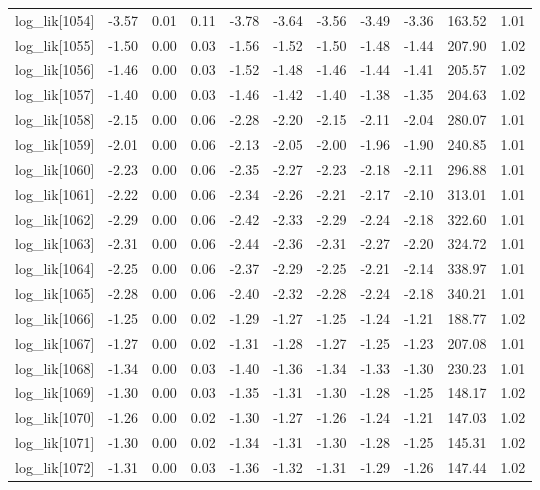 \begin{table}[ht]
\begin{tabular}{rrrrrrrrrrr}
  log\_lik[1054] & -3.57 & 0.01 & 0.11 & -3.78 & -3.64 & -3.56 & -3.49 & -3.36 & 163.52 & 1.01 \\ 
  log\_lik[1055] & -1.50 & 0.00 & 0.03 & -1.56 & -1.52 & -1.50 & -1.48 & -1.44 & 207.90 & 1.02 \\ 
  log\_lik[1056] & -1.46 & 0.00 & 0.03 & -1.52 & -1.48 & -1.46 & -1.44 & -1.41 & 205.57 & 1.02 \\ 
  log\_lik[1057] & -1.40 & 0.00 & 0.03 & -1.46 & -1.42 & -1.40 & -1.38 & -1.35 & 204.63 & 1.02 \\ 
  log\_lik[1058] & -2.15 & 0.00 & 0.06 & -2.28 & -2.20 & -2.15 & -2.11 & -2.04 & 280.07 & 1.01 \\ 
  log\_lik[1059] & -2.01 & 0.00 & 0.06 & -2.13 & -2.05 & -2.00 & -1.96 & -1.90 & 240.85 & 1.01 \\ 
  log\_lik[1060] & -2.23 & 0.00 & 0.06 & -2.35 & -2.27 & -2.23 & -2.18 & -2.11 & 296.88 & 1.01 \\ 
  log\_lik[1061] & -2.22 & 0.00 & 0.06 & -2.34 & -2.26 & -2.21 & -2.17 & -2.10 & 313.01 & 1.01 \\ 
  log\_lik[1062] & -2.29 & 0.00 & 0.06 & -2.42 & -2.33 & -2.29 & -2.24 & -2.18 & 322.60 & 1.01 \\ 
  log\_lik[1063] & -2.31 & 0.00 & 0.06 & -2.44 & -2.36 & -2.31 & -2.27 & -2.20 & 324.72 & 1.01 \\ 
  log\_lik[1064] & -2.25 & 0.00 & 0.06 & -2.37 & -2.29 & -2.25 & -2.21 & -2.14 & 338.97 & 1.01 \\ 
  log\_lik[1065] & -2.28 & 0.00 & 0.06 & -2.40 & -2.32 & -2.28 & -2.24 & -2.18 & 340.21 & 1.01 \\ 
  log\_lik[1066] & -1.25 & 0.00 & 0.02 & -1.29 & -1.27 & -1.25 & -1.24 & -1.21 & 188.77 & 1.02 \\ 
  log\_lik[1067] & -1.27 & 0.00 & 0.02 & -1.31 & -1.28 & -1.27 & -1.25 & -1.23 & 207.08 & 1.01 \\ 
  log\_lik[1068] & -1.34 & 0.00 & 0.03 & -1.40 & -1.36 & -1.34 & -1.33 & -1.30 & 230.23 & 1.01 \\ 
  log\_lik[1069] & -1.30 & 0.00 & 0.03 & -1.35 & -1.31 & -1.30 & -1.28 & -1.25 & 148.17 & 1.02 \\ 
  log\_lik[1070] & -1.26 & 0.00 & 0.02 & -1.30 & -1.27 & -1.26 & -1.24 & -1.21 & 147.03 & 1.02 \\ 
  log\_lik[1071] & -1.30 & 0.00 & 0.02 & -1.34 & -1.31 & -1.30 & -1.28 & -1.25 & 145.31 & 1.02 \\ 
  log\_lik[1072] & -1.31 & 0.00 & 0.03 & -1.36 & -1.32 & -1.31 & -1.29 & -1.26 & 147.44 & 1.02 \\ 

\end{tabular}
\end{table}
